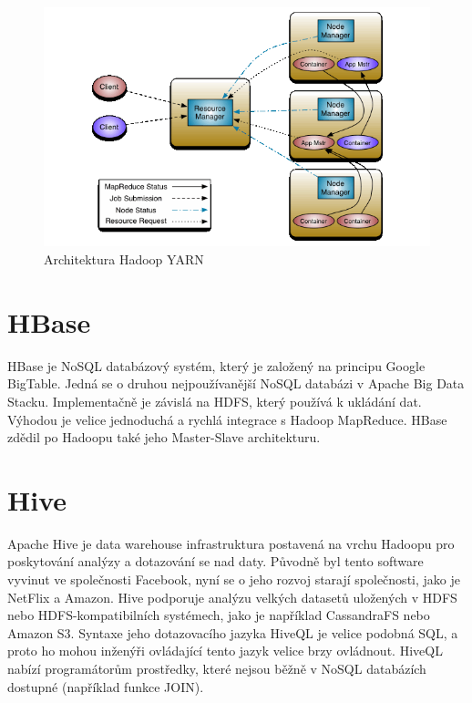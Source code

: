 \begin{figure}[h]
\centering
\includegraphics[scale=0.7]{images/yarn_architecture}
\caption{Architektura Hadoop YARN}
\label{fig:yarn}

\end{figure}



\newpage 

\section{HBase}
HBase je NoSQL databázový systém, který je založený na principu Google BigTable. Jedná se o druhou nejpoužívanější NoSQL databázi v Apache Big Data Stacku. Implementačně je závislá na HDFS, který používá k ukládání dat. Výhodou je velice jednoduchá a rychlá integrace s Hadoop MapReduce. HBase zdědil po Hadoopu také jeho Master-Slave architekturu.


\section{Hive}


Apache Hive je data warehouse infrastruktura postavená na vrchu Hadoopu pro poskytování analýzy a dotazování se nad daty. Původně byl tento software vyvinut ve společnosti Facebook, nyní se o jeho rozvoj starají společnosti, jako je NetFlix a Amazon. Hive podporuje analýzu velkých datasetů uložených v HDFS nebo HDFS-kompatibilních systémech, jako je například CassandraFS nebo Amazon S3. Syntaxe jeho dotazovacího jazyka HiveQL je velice podobná SQL, a proto ho mohou inženýři ovládající tento jazyk velice brzy ovládnout. HiveQL nabízí programátorům prostředky, které nejsou běžně v NoSQL databázích dostupné (například funkce JOIN). 

